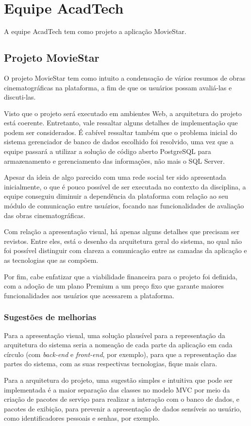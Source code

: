 \chapter[Equipe AcadTech]{Equipe AcadTech}
A equipe AcadTech tem como projeto a aplicação MovieStar.


\section{Projeto MovieStar}
O projeto MovieStar tem como intuito a condensação de vários resumos de obras cinematográficas na plataforma, a fim de que os usuários possam avaliá-las e discuti-las.


Visto que o projeto será executado em ambientes Web, a arquitetura do projeto está coerente. Entretanto, vale ressaltar alguns detalhes de implementação que podem ser considerados. É cabível ressaltar também que o problema inicial do sistema gerenciador de banco de dados escolhido foi resolvido, uma vez que a equipe passará a utilizar a solução de código aberto PostgreSQL para armazenamento e gerenciamento das informações, não mais o SQL Server.


Apesar da ideia de algo parecido com uma rede social ter sido apresentada inicialmente, o que é pouco possível de ser executada no contexto da disciplina, a equipe conseguiu diminuir a dependência da plataforma com relação ao seu módulo de comunicação entre usuários, focando nas funcionalidades de avaliação das obras cinematográficas.


Com relação a apresentação visual, há apenas alguns detalhes que precisam ser revistos. Entre eles, está o desenho da arquitetura geral do sistema, no qual não foi possível distinguir com clareza a comunicação entre as camadas da aplicação e as tecnologias que as compõem.


Por fim, cabe enfatizar que a viabilidade financeira para o projeto foi definida, com a adoção de um plano Premium a um preço fixo que garante maiores funcionalidades aos usuários que acessarem a plataforma.


\subsection{Sugestões de melhorias}
Para a apresentação visual, uma solução plausível para a representação da arquitetura do sistema seria a nomeação de cada parte da aplicação em cada círculo (com \textit{back-end} e \textit{front-end}, por exemplo), para que a representação das partes do sistema, com as suas respectivas tecnologias, fique mais clara. 


Para a arquitetura do projeto, uma sugestão simples e intuitiva que pode ser implementada é a maior separação das classes no modelo MVC por meio da criação de pacotes de serviço para realizar a interação com o banco de dados, e pacotes de exibição, para prevenir a apresentação de dados sensíveis ao usuário, como identificadores pessoais e senhas, por exemplo.